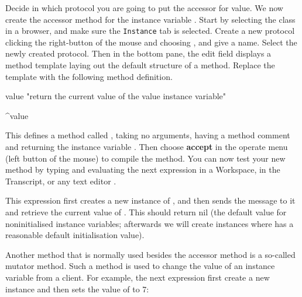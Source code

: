 \exercise  Decide in which protocol you are going to put the
accessor for value. We now create the accessor method for
the instance variable . Start by selecting
the class  in a browser, and make sure the
\texttt{Instance} tab is selected. Create a new protocol
clicking the right-button of the mouse and choosing ,
and give a name. Select the newly created protocol. Then in the bottom pane, the edit field displays a method template laying out the default structure
of a method. Replace the template with the following method
definition.

\begin{code}
value
  "return the current value of the value instance variable"

  ^value
  
\end{code}

This defines a method called , taking no
arguments, having a method comment and returning the instance
variable . Then choose \textbf{accept} in the
operate menu (left button of the mouse) to compile the method. You
can now test your new method by typing and evaluating the next
expression in a Workspace, in the Transcript, or any text editor .




This expression first creates a new instance of
, and then sends the message
 to it and retrieve the current value of
. This should return nil (the default value
for noninitialised instance variables; afterwards we will create
instances where  has a reasonable default
initialisation value). 


\exercise  Another method that is normally used besides the
accessor method is a so-called mutator method. Such a
method is used to change the value of an instance variable from a
client. For example, the next expression first create a new
 instance and then sets the value of
 to 7: 


